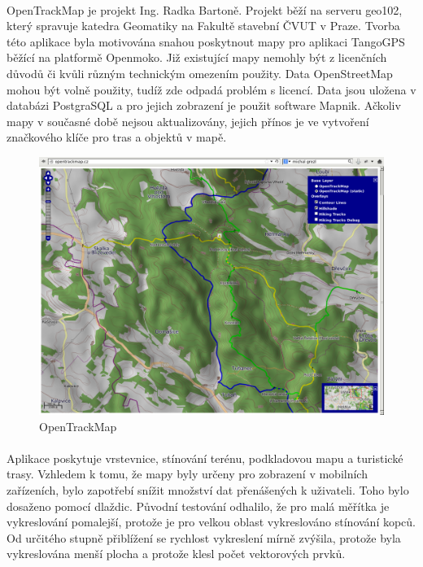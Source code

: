 \documentclass[11pt,a4paper,titlepage,oneside]{book}
\begin{document}
		\paragraph{} OpenTrackMap je projekt Ing. Radka Bartoně. Projekt běží na serveru geo102, který spravuje katedra Geomatiky na Fakultě stavební ČVUT v Praze. Tvorba této aplikace byla motivována snahou poskytnout mapy pro aplikaci TangoGPS běžící na platformě Openmoko\cite{OTM}. Již existující mapy nemohly být z licenčních důvodů či kvůli různým technickým omezením použity. Data OpenStreetMap mohou být volně použity, tudíž zde odpadá problém s licencí. Data jsou uložena v databázi PostgraSQL a pro jejich zobrazení je použit software Mapnik. Ačkoliv mapy v současné době nejsou aktualizovány, jejich přínos je ve vytvoření značkového klíče pro tras a objektů v mapě. 

		\begin{figure}[!h]
			\begin{center}
				\includegraphics[width=12cm]{obrazky/otm.png}
				\caption{OpenTrackMap}
			\end{center}
		\end{figure}

		\paragraph{}  Aplikace poskytuje vrstevnice, stínování terénu, podkladovou mapu a turistické trasy. Vzhledem k tomu, že mapy byly určeny pro zobrazení v mobilních zařízeních, bylo zapotřebí snížit množství dat přenášených k uživateli. Toho bylo dosaženo pomocí dlaždic. Původní testování odhalilo, že pro malá měřítka je vykreslování pomalejší, protože je pro velkou oblast vykreslováno stínování kopců. Od určitého stupně přiblížení se rychlost vykreslení mírně zvýšila, protože byla vykreslována menší plocha a protože klesl počet vektorových prvků.
\end{document}
